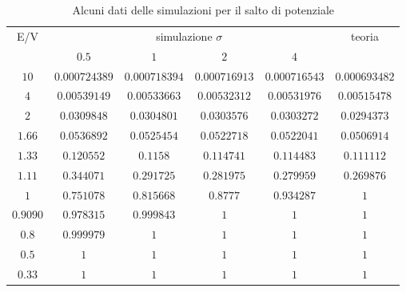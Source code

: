\begin{table}[hbt]
	\centering
	\begin{tabular}{cccccc}
		\toprule
		\multirow{2}{*}{E/V} &           \multicolumn{4}{c}{simulazione $\sigma$}            & \multirow{2}{*}{teoria} \\
		\cmidrule(lr){2-5}  &     $0.5$     &      $1$      &      $2$      &      $4$      &  \\ \midrule
		$10$         & $0.000724389$ & $0.000718394$ & $0.000716913$ & $0.000716543$ &      $0.000693482$      \\ \midrule
		$4$          & $0.00539149$  & $0.00533663$  & $0.00532312$  & $0.00531976$  &      $0.00515478$       \\ \midrule
		$2$          &  $0.0309848$  &  $0.0304801$  &  $0.0303576$  &  $0.0303272$  &       $0.0294373$       \\ \midrule
		$1.66$        &  $0.0536892$  &  $0.0525454$  &  $0.0522718$  &  $0.0522041$  &       $0.0506914$       \\ \midrule
		$1.33$        &  $0.120552$   &   $0.1158$    &  $0.114741$   &  $0.114483$   &       $0.111112$        \\ \midrule
		$1.11$        &  $0.344071$   &  $0.291725$   &  $0.281975$   &  $0.279959$   &       $0.269876$        \\ \midrule
		$1$          &  $0.751078$   &  $0.815668$   &   $0.8777$    &  $0.934287$   &           $1$           \\ \midrule
		$0.9090$       &  $0.978315$   &  $0.999843$   &      $1$      &      $1$      &           $1$           \\ \midrule
		$0.8$         &  $0.999979$   &      $1$      &      $1$      &      $1$      &           $1$           \\ \midrule
		$0.5$         &      $1$      &      $1$      &      $1$      &      $1$      &           $1$           \\ \midrule
		$0.33$        &      $1$      &      $1$      &      $1$      &      $1$      &           $1$           \\ \bottomrule
	\end{tabular}
	\caption{Alcuni dati delle simulazioni per il salto di potenziale}\label{tab:SaltoDati}
\end{table}